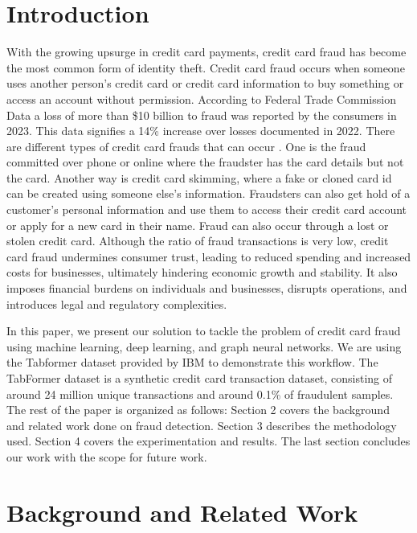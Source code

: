 \documentclass[pdflatex,sn-mathphys-num]{sn-jnl}%
\begin{document}
\section{Introduction}\label{sec1}

With the growing upsurge in credit card payments, credit card fraud has become the most common form of identity theft. Credit card fraud occurs when someone uses another person’s credit card or credit card information to buy something or access an account without permission.  According to Federal Trade Commission Data \cite{ftc2024} a loss of more than \$10 billion to fraud was reported by the consumers in 2023. This data signifies a 14\% increase over losses documented in 2022. There are different types of credit card frauds that can occur \cite{capitalone2024}. One is the fraud committed over phone or online where the fraudster has the card details but not the card. Another way is credit card skimming, where a fake or cloned card id can be created using someone else’s information. Fraudsters can also get hold of a customer’s personal information and use them to access their credit card account or apply for a new card in their name. Fraud can also occur through a lost or stolen credit card. Although the ratio of fraud transactions is very low, credit card fraud undermines consumer trust, leading to reduced spending and increased costs for businesses, ultimately hindering economic growth and stability. It also imposes financial burdens on individuals and businesses, disrupts operations, and introduces legal and regulatory complexities.

In this paper, we present our solution to tackle the problem of credit card fraud using machine learning, deep learning, and graph neural networks. We are using the Tabformer dataset provided by IBM \cite{ibm2021} to demonstrate this workflow. The TabFormer dataset is a synthetic credit card transaction dataset, consisting of around 24 million unique transactions and around 0.1\% of fraudulent samples. The rest of the paper is organized as follows: Section 2 covers the background and related work done on fraud detection. Section 3 describes the methodology used. Section 4 covers the experimentation and results. The last section concludes our work with the scope for future work.

\section{Background and Related Work}\label{sec2}
\end{document}
